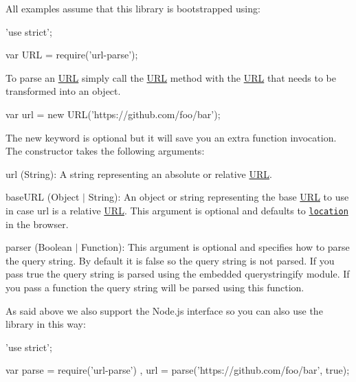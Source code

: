 All examples assume that this library is bootstrapped using\+:


\begin{DoxyCode}
'use strict';

var URL = require('url-parse');
\end{DoxyCode}


To parse an \mbox{\hyperlink{namespace_u_r_l}{U\+RL}} simply call the {\ttfamily \mbox{\hyperlink{namespace_u_r_l}{U\+RL}}} method with the \mbox{\hyperlink{namespace_u_r_l}{U\+RL}} that needs to be transformed into an object.


\begin{DoxyCode}
var url = new URL('https://github.com/foo/bar');
\end{DoxyCode}


The {\ttfamily new} keyword is optional but it will save you an extra function invocation. The constructor takes the following arguments\+:


\begin{DoxyItemize}
\item {\ttfamily url} ({\ttfamily String})\+: A string representing an absolute or relative \mbox{\hyperlink{namespace_u_r_l}{U\+RL}}.
\item {\ttfamily base\+U\+RL} ({\ttfamily Object} $\vert$ {\ttfamily String})\+: An object or string representing the base \mbox{\hyperlink{namespace_u_r_l}{U\+RL}} to use in case {\ttfamily url} is a relative \mbox{\hyperlink{namespace_u_r_l}{U\+RL}}. This argument is optional and defaults to \href{https://developer.mozilla.org/en-US/docs/Web/API/Location}{\tt {\ttfamily location}} in the browser.
\item {\ttfamily parser} ({\ttfamily Boolean} $\vert$ {\ttfamily Function})\+: This argument is optional and specifies how to parse the query string. By default it is {\ttfamily false} so the query string is not parsed. If you pass {\ttfamily true} the query string is parsed using the embedded {\ttfamily querystringify} module. If you pass a function the query string will be parsed using this function.
\end{DoxyItemize}

As said above we also support the Node.\+js interface so you can also use the library in this way\+:


\begin{DoxyCode}
'use strict';

var parse = require('url-parse')
  , url = parse('https://github.com/foo/bar', true);
\end{DoxyCode}


